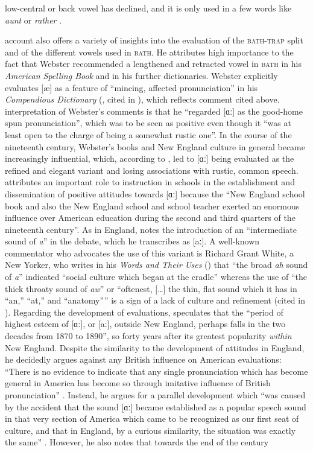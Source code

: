 low-central or back vowel has declined, and it is only used in a few words like \emph{aunt} or \emph{rather} \citep[97]{Thomas2008}.


 account also offers a variety of insights into the evaluation of the \textsc{bath-trap} split and of the different vowels used in \textsc{bath.} He attributes high importance to the fact that Webster recommended a lengthened and retracted vowel in \textsc{bath} in his \emph{American Spelling Book} and in his further dictionaries. Webster explicitly evaluates [æ] as a feature of “mincing, affected pronunciation” in his \emph{Compendious Dictionary} (\citeyear{Webster1806}, cited in \citealt[68]{Krapp19252}), which reflects  comment cited above.  interpretation of Webster’s comments is that he “regarded [ɑː] as the good-home spun pronunciation”, which was to be seen as positive even though it “was at least open to the charge of being a somewhat rustic one”. In the course of the nineteenth century, Webster’s books and New England culture in general became increasingly influential, which, according to \citet[69]{Krapp19252}, led to [ɑː] being evaluated as the refined and elegant variant and losing associations with rustic, common speech. \citet[75]{Krapp19252} attributes an important role to instruction in schools in the establishment and dissemination of positive attitudes towards [ɑː] because the “New England school book and also the New England school and school teacher exerted an enormous influence over American education during the second and third quarters of the nineteenth century”. As in England, \citet[74--75]{Krapp19252} notes the introduction of an “intermediate sound of \emph{a}” in the debate, which he transcribes as [aː]. A well-known commentator who advocates the use of this variant is Richard Grant White, a New Yorker, who writes in his \emph{Words and Their Uses} (\citeyear[62]{White1870}) that “the broad \emph{ah} sound of \emph{a}” indicated “social culture which began at the cradle” whereas the use of “the thick throaty sound of \emph{aw}” or “oftenest, […] the thin, flat sound which it has in “an,” “at,” and “anatomy”” is a sign of a lack of culture and refinement (cited in \citealt[76]{Krapp19252}). Regarding the development of evaluations, \citet[76--77]{Krapp19252} speculates that the “period of highest esteem of [ɑː], or [aː], outside New England, perhaps falls in the two decades from 1870 to 1890”, so forty years after its greatest popularity \emph{within} New England. Despite the similarity to the development of attitudes in England, he decidedly argues against any British influence on American evaluations: “There is no evidence to indicate that any single pronunciation which has become general in America has become so through imitative influence of British pronunciation” \citep[80]{Krapp19252}. Instead, he argues for a parallel development which “was caused by the accident that the sound [ɑː] became established as a popular speech sound in that very section of America which came to be recognized as our first seat of culture, and that in England, by a curious similarity, the situation was exactly the same” \citep[80]{Krapp19252}. However, he also notes that towards the end of the century 